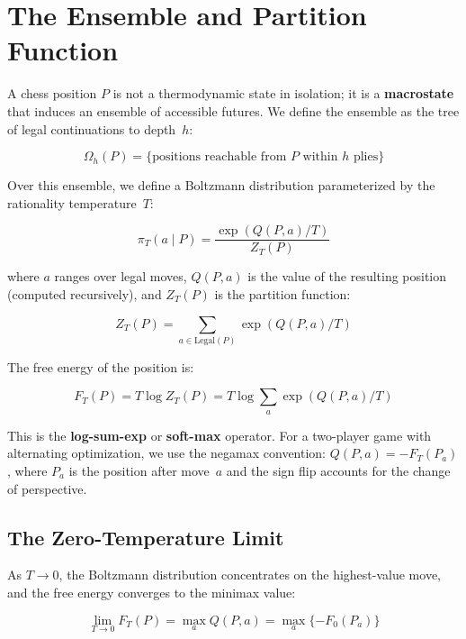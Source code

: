\documentclass[11pt,a4paper]{article}
\begin{document}
\section{The Ensemble and Partition Function}

A chess position $P$ is not a thermodynamic state in isolation; it is a
\textbf{macrostate} that induces an ensemble of accessible futures. We
define the ensemble as the tree of legal continuations to depth~$h$:

\begin{equation}
\Omega_h(P) = \{\text{positions reachable from } P \text{ within } h
\text{ plies}\}
\end{equation}

Over this ensemble, we define a Boltzmann distribution parameterized by
the rationality temperature~$T$:

\begin{equation}
\pi_T(a \mid P) = \frac{\exp(Q(P, a) / T)}{Z_T(P)}
\end{equation}

where $a$ ranges over legal moves, $Q(P, a)$ is the value of the
resulting position (computed recursively), and $Z_T(P)$ is the partition
function:

\begin{equation}
Z_T(P) = \sum_{a \in \text{Legal}(P)} \exp(Q(P, a) / T)
\end{equation}

The free energy of the position is:

\begin{equation}
\boxed{F_T(P) = T \log Z_T(P) = T \log \sum_{a} \exp(Q(P, a) / T)}
\end{equation}

This is the \textbf{log-sum-exp} or \textbf{soft-max} operator. For a
two-player game with alternating optimization, we use the negamax
convention: $Q(P, a) = -F_T(P_a)$, where $P_a$ is the position after
move~$a$ and the sign flip accounts for the change of perspective.

\subsection{The Zero-Temperature Limit}

As $T \to 0$, the Boltzmann distribution concentrates on the
highest-value move, and the free energy converges to the minimax value:

\begin{equation}
\lim_{T \to 0} F_T(P) = \max_{a} Q(P, a) = \max_{a} \{-F_0(P_a)\}
\end{equation}
\end{document}
